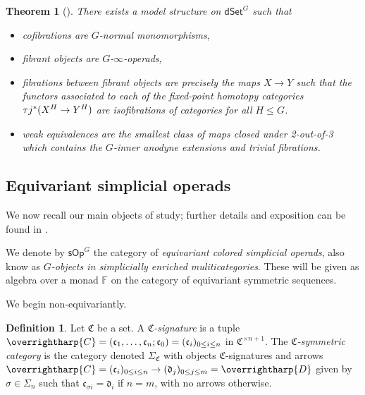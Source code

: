 \documentclass[a4paper,10pt
,draft
]{article}%
\numberwithin{equation}{section}
\numberwithin{figure}{section}
\newtheorem{theorem}[equation]{Theorem}%
\theoremstyle{definition} %
\newtheorem{definition}[equation]{Definition}%
\newcommand{\vect}[1]{\text{\overrightharp{\ensuremath{#1}}}}
\newcommand{\dSet}{\mathsf{dSet}}
\newcommand{\1}{\ensuremath{\mathbbm 1}}%
\begin{document}
\begin{theorem}[{\cite[Thm 2.1, Thm 8.22]{Per18}}]
      There exists a model structure on $\dSet^G$ such that
      \begin{itemize}
      \item cofibrations are $G$-normal monomorphisms,
      \item fibrant objects are $G$-$\infty$-operads,
      \item fibrations between fibrant objects are precisely the maps $X \to Y$ such that the functors associated to each of the fixed-point homotopy categories $\tau j^{\**}(X^H \to Y^H)$ are isofibrations of categories for all $H \leq G$.
      \item weak equivalences are the smallest class of maps closed under 2-out-of-3 which
            contains the $G$-inner anodyne extensions and trivial fibrations.
      \end{itemize}
\end{theorem}







\subsection{Equivariant simplicial operads}

We now recall our main objects of study; further details and exposition can be found in \cite[\S 2]{BP_HGOP}.

We denote by $\mathsf{sOp}^G$ the category of \textit{equivariant colored simplicial operads}, also know as \textit{$G$-objects in simplicially enriched muliticategories}.
These will be given as algebra over a monad $\mathbb F$ on the category of equivariant symmetric sequences.

We begin non-equivariantly.
\begin{definition}
      Let $\mathfrak C$ be a set. A \textit{$\mathfrak C$-signature} is a tuple
      $\vect C = (\mathfrak c_1, \dots, \mathfrak c_n; \mathfrak c_0) = (\mathfrak c_i)_{0 \leq i \leq n}$ in $\mathfrak C^{\times n+1}$.
      The \textit{$\mathfrak C$-symmetric category} is the category denoted $\Sigma_{\mathfrak C}$ with
      objects $\mathfrak C$-signatures and
      arrows $\vect C = (\mathfrak c_i)_{0 \leq i \leq n} \to (\mathfrak d_j)_{0 \leq j \leq m} = \vect D$
      given by $\sigma \in \Sigma_n$ such that $\mathfrak c_{\sigma i} = \mathfrak d_i$ if $n = m$, with no arrows otherwise.
\end{definition}
\end{document}
